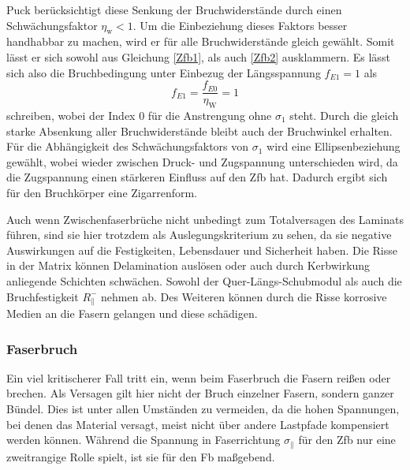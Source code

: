 \noindent Puck berücksichtigt diese Senkung der Bruchwiderstände durch einen Schwächungsfaktor $\eta_\mathrm{w} < 1$. Um die Einbeziehung dieses Faktors besser handhabbar zu machen, wird er für alle Bruchwiderstände gleich gewählt. Somit lässt er sich sowohl aus Gleichung \ref{Zfb1}, als auch \ref{Zfb2} ausklammern. Es lässt sich also die Bruchbedingung unter Einbezug der Längsspannung $f_{E1} = 1$ als
\begin{equation}
	f_{E1} = \frac{f_{E0}}{\eta_\mathrm{W}} = 1
\end{equation}
schreiben, wobei der Index 0 für die Anstrengung ohne $\sigma_1$ steht. Durch die gleich starke Absenkung aller Bruchwiderstände bleibt auch der Bruchwinkel erhalten. Für die Abhängigkeit des Schwächungsfaktors von $\sigma_1$ wird eine Ellipsenbeziehung gewählt, wobei wieder zwischen Druck- und Zugspannung unterschieden wird, da die Zugspannung einen stärkeren Einfluss auf den Zfb hat. Dadurch ergibt sich für den Bruchkörper eine Zigarrenform.

\noindent Auch wenn Zwischenfaserbrüche nicht unbedingt zum Totalversagen des Laminats führen, sind sie hier trotzdem als Auslegungskriterium zu sehen, da sie negative Auswirkungen auf die Festigkeiten, Lebensdauer und Sicherheit haben. Die Risse in der Matrix können Delamination auslösen oder auch durch Kerbwirkung anliegende Schichten schwächen. Sowohl der Quer-Längs-Schubmodul als auch die Bruchfestigkeit $R_\parallel^-$ nehmen ab. Des Weiteren können durch die Risse korrosive Medien an die Fasern gelangen und diese schädigen.
\subsubsection{Faserbruch}
Ein viel kritischerer Fall tritt ein, wenn beim Faserbruch die Fasern reißen oder brechen. Als Versagen gilt hier nicht der Bruch einzelner Fasern, sondern ganzer Bündel. Dies ist unter allen Umständen zu vermeiden, da die hohen Spannungen, bei denen das Material versagt, meist nicht über andere Lastpfade kompensiert werden können. Während die Spannung in Faserrichtung $\sigma_{\parallel}$ für den Zfb nur eine zweitrangige Rolle spielt, ist sie für den Fb maßgebend.
